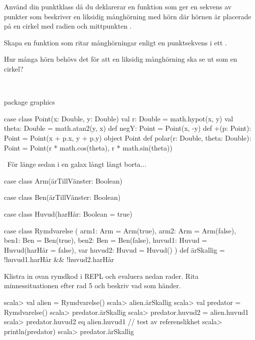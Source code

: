 \Subtask Använd din punktklass då du deklarerar en funktion  som ger en sekvens av punkter som beskriver en liksidig månghörning med  hörn där hörnen är placerade på en cirkel med radien  och mittpunkten .

\Subtask Skapa en funktion  som ritar månghörningar enligt en punktsekvens  i ett .

\Subtask Hur många hörn behövs det för att en liksidig månghörning ska se ut som en cirkel?

\SOLUTION

\TaskSolved \what~

\Subtask \begin{Code}
package graphics

case class Point(x: Double, y: Double) {
  val r: Double          = math.hypot(x, y)
  val theta: Double      = math.atan2(y, x)
  def negY: Point        = Point(x, -y)
  def +(p: Point): Point = Point(x + p.x, y + p.y)
}
object Point {
  def polar(r: Double, theta: Double): Point =
    Point(r * math.cos(theta), r * math.sin(theta))
}
\end{Code}

\Subtask \TODO

\Subtask \TODO

\Subtask \TODO


\QUESTEND





\QUESTBEGIN

\Task  \what~För länge sedan i en galax långt långt borta...

\begin{Code}
case class Arm(ärTillVänster: Boolean)

case class Ben(ärTillVänster: Boolean)

case class Huvud(harHår: Boolean = true)

case class Rymdvarelse (
      arm1:   Arm   = Arm(true),
      arm2:   Arm   = Arm(false),
      ben1:   Ben   = Ben(true),
      ben2:   Ben   = Ben(false),
      huvud1: Huvud = Huvud(harHår = false),
  var huvud2: Huvud = Huvud()
) {
  def ärSkallig = !huvud1.harHår && !huvud2.harHår
}
\end{Code}

\Subtask Klistra in ovan rymdkod i REPL och evaluera nedan rader. Rita minnessituationen efter rad 5 och beskriv vad som händer.
\begin{REPL}
scala> val alien = Rymdvarelse()
scala> alien.ärSkallig
scala> val predator = Rymdvarelse()
scala> predator.ärSkallig
scala> predator.huvud2 = alien.huvud1
scala> predator.huvud2 eq alien.huvud1  // test av referenslikhet
scala> println(predator)
scala> predator.ärSkallig
\end{REPL}


